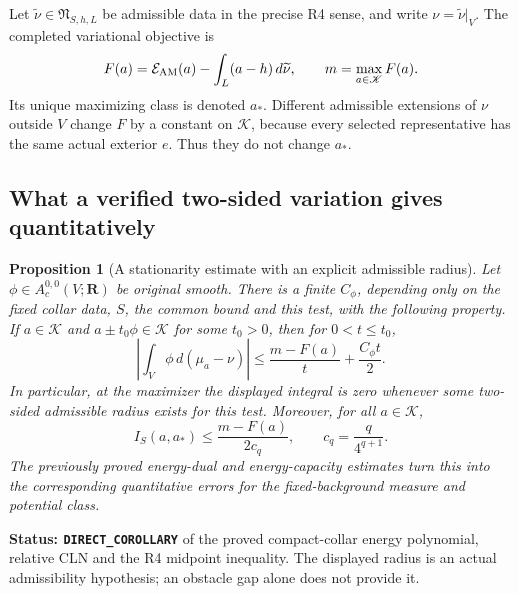 \documentclass[11pt,a4paper]{article}
\numberwithin{equation}{section}
\newtheorem{proposition}[theorem]{Proposition}
\theoremstyle{definition}
\theoremstyle{remark}
\begin{document}
Let $\widetilde\nu\in\mathfrak N_{S,h,L}$ be admissible data in the
precise R4 sense, and write $\nu=\widetilde\nu|_V$. The completed
variational objective is
\[
 F(a)=\mathcal E_{\rm AM}(a)-\int_L(a-h)\,d\widetilde\nu,
       \qquad m=\max_{a\in\mathscr K}F(a).
\]
Its unique maximizing class is denoted $a_*$. Different admissible
extensions of $\nu$ outside $V$ change $F$ by a constant on
$\mathscr K$, because every selected representative has the same
actual exterior $e$. Thus they do not change $a_*$.

\subsection{What a verified two-sided variation gives quantitatively}

\begin{proposition}[A stationarity estimate with an explicit admissible radius]
\label{prop:r6-admissible-stationarity-estimate}
Let $\phi\in A_c^{0,0}(V;\mathbf R)$ be original smooth. There is a
finite $C_\phi$, depending only on the fixed collar data, $S$, the common
bound and this test, with the following property. If $a\in\mathscr K$
and $a\pm t_0\phi\in\mathscr K$ for some $t_0>0$, then for
$0<t\le t_0$,
\begin{equation}
 \left|\int_V\phi\,d(\mu_a-\nu)\right|
              \le \frac{m-F(a)}{t}+\frac{C_\phi t}{2}.
 \label{eq:r6-stationarity-defect}
\end{equation}
In particular, at the maximizer the displayed integral is zero whenever
some two-sided admissible radius exists for this test.
Moreover, for all $a\in\mathscr K$,
\begin{equation}
 I_S(a,a_*)\le\frac{m-F(a)}{2c_q},
                     \qquad c_q=\frac{q}{4^{q+1}}.
 \label{eq:r6-objective-energy-gap}
\end{equation}
The previously proved energy-dual and energy-capacity estimates turn
this into the corresponding quantitative errors for the fixed-background
measure and potential class.
\end{proposition}

\noindent\textbf{Status: \texttt{DIRECT\_COROLLARY}} of the proved
compact-collar energy polynomial, relative CLN and the R4 midpoint
inequality. The displayed radius is an actual admissibility hypothesis;
an obstacle gap alone does not provide it.
\end{document}

